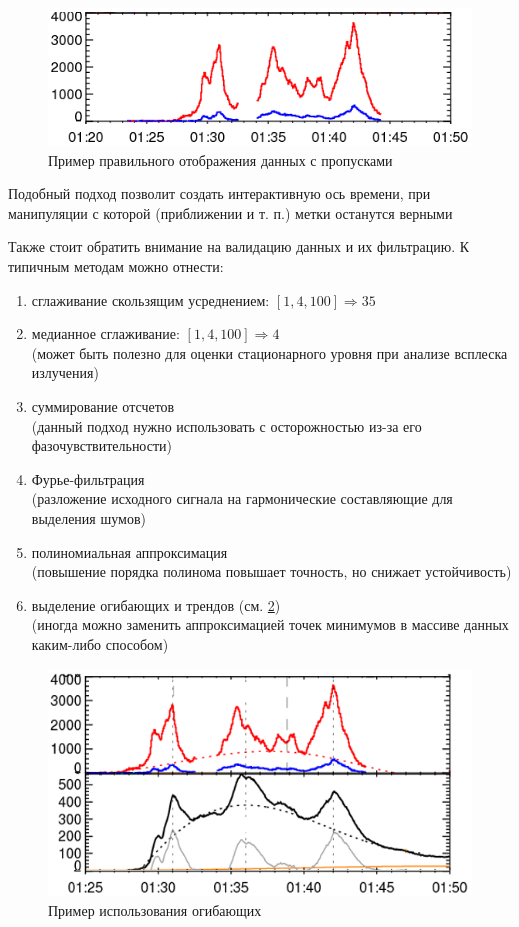 \begin{enumerate}
	\begin{figure}[h!]
		\centering
		\includegraphics[width=0.65\linewidth]{images/grechnev3.png}
		\caption{Пример правильного отображения данных с пропусками}
		\label{grechnev3}
	\end{figure}

	Подобный подход позволит создать интерактивную ось времени, при манипуляции с которой (приближении и т. п.) метки останутся верными

	Также стоит обратить внимание на валидацию данных и их фильтрацию. К типичным методам можно отнести:
	\begin{enumerate}
		\item сглаживание скользящим усреднением: $[1, 4, 100] \Rightarrow 35$
		\item медианное сглаживание: $[1, 4, 100] \Rightarrow 4$\\
		(может быть полезно для оценки стационарного уровня при анализе всплеска излучения)
		\item суммирование отсчетов\\
		(данный подход нужно использовать с осторожностью из-за его фазочувствительности)
		\item Фурье-фильтрация\\
		(разложение исходного сигнала на гармонические составляющие для выделения шумов)
		\item полиномиальная аппроксимация\\
		(повышение порядка полинома повышает точность, но снижает устойчивость)
		\item выделение огибающих и трендов (см. \cref{grechnev4})\\
		(иногда можно заменить аппроксимацией точек минимумов в массиве данных каким-либо способом)
	\end{enumerate}

	\begin{figure}[h!]
		\centering
		\includegraphics[width=0.65\linewidth]{images/grechnev4.png}
		\caption{Пример использования огибающих}
		\label{grechnev4}
	\end{figure}



\end{enumerate}
